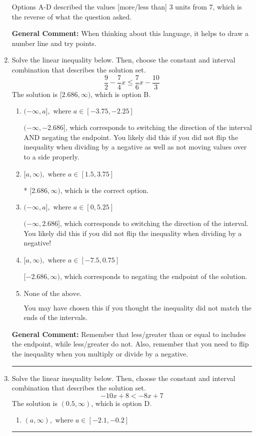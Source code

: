 \documentclass{extbook}[14pt]
\newcommand{\litem}[1]{\item #1

\rule{\textwidth}{0.4pt}}
\begin{document}
\begin{enumerate}
{\begin{enumerate}[label=\Alph*.]
Options A-D described the values [more/less than] 3 units from 7, which is the reverse of what the question asked.
\end{enumerate}

\textbf{General Comment:} When thinking about this language, it helps to draw a number line and try points.
}
\litem{
Solve the linear inequality below. Then, choose the constant and interval combination that describes the solution set.
\[ \frac{9}{2} - \frac{7}{4} x \leq \frac{7}{6} x - \frac{10}{3} \]The solution is \( [2.686, \infty) \), which is option B.\begin{enumerate}[label=\Alph*.]
\item \( (-\infty, a], \text{ where } a \in [-3.75, -2.25] \)

 $(-\infty, -2.686]$, which corresponds to switching the direction of the interval AND negating the endpoint. You likely did this if you did not flip the inequality when dividing by a negative as well as not moving values over to a side properly.
\item \( [a, \infty), \text{ where } a \in [1.5, 3.75] \)

* $[2.686, \infty)$, which is the correct option.
\item \( (-\infty, a], \text{ where } a \in [0, 5.25] \)

 $(-\infty, 2.686]$, which corresponds to switching the direction of the interval. You likely did this if you did not flip the inequality when dividing by a negative!
\item \( [a, \infty), \text{ where } a \in [-7.5, 0.75] \)

 $[-2.686, \infty)$, which corresponds to negating the endpoint of the solution.
\item \( \text{None of the above}. \)

You may have chosen this if you thought the inequality did not match the ends of the intervals.
\end{enumerate}

\textbf{General Comment:} Remember that less/greater than or equal to includes the endpoint, while less/greater do not. Also, remember that you need to flip the inequality when you multiply or divide by a negative.
}
\litem{
Solve the linear inequality below. Then, choose the constant and interval combination that describes the solution set.
\[ -10x + 8 < -8x + 7 \]The solution is \( (0.5, \infty) \), which is option D.\begin{enumerate}[label=\Alph*.]
\item \( (a, \infty), \text{ where } a \in [-2.1, -0.2] \)


\end{enumerate}}
\end{enumerate}
\end{document}
